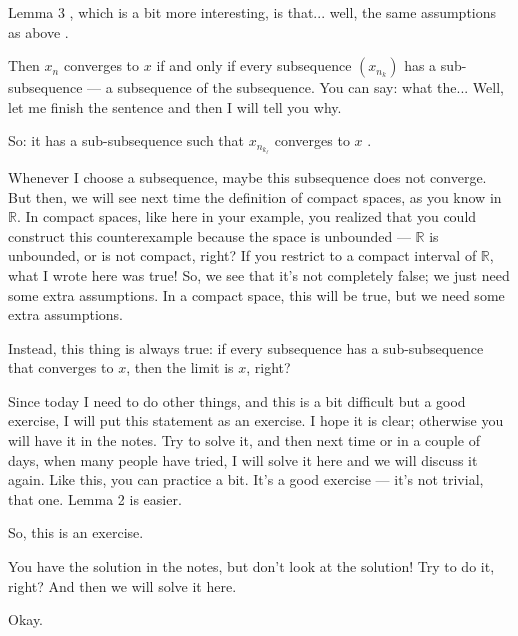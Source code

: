 \begin{speech}[00:45:46 - 00:47:26]
Lemma 3 , which is a bit more interesting, is that... well, the same assumptions as above .

Then $x_n$ converges to $x$  if and only if every subsequence $(x_{n_k})$  has a sub-subsequence  --- a subsequence of the subsequence. You can say: what the... Well, let me finish the sentence and then I will tell you why.

So: it has a sub-subsequence such that $x_{n_{k_\ell}}$ converges to $x$ .
\end{speech}

\begin{speech}[00:47:26 - 00:49:06]
Whenever I choose a subsequence, maybe this subsequence does not converge. But then, we will see next time the definition of compact spaces, as you know in $\mathbb{R}$. In compact spaces, like here in your example, you realized that you could construct this counterexample because the space is unbounded --- $\mathbb{R}$ is unbounded, or is not compact, right? If you restrict to a compact interval of $\mathbb{R}$, what I wrote here was true! So, we see that it's not completely false; we just need some extra assumptions. In a compact space, this will be true, but we need some extra assumptions.

Instead, this thing is always true: if every subsequence has a sub-subsequence that converges to $x$, then the limit is $x$, right?

Since today I need to do other things, and this is a bit difficult but a good exercise, I will put this statement as an exercise. I hope it is clear; otherwise you will have it in the notes. Try to solve it, and then next time or in a couple of days, when many people have tried, I will solve it here and we will discuss it again. Like this, you can practice a bit. It's a good exercise --- it's not trivial, that one. Lemma 2 is easier.

So, this is an exercise.
\end{speech}

\begin{speech}[00:49:06 - 00:49:34]
 You have the solution in the notes, but don't look at the solution! Try to do it, right? And then we will solve it here.

 Okay.
\end{speech}

